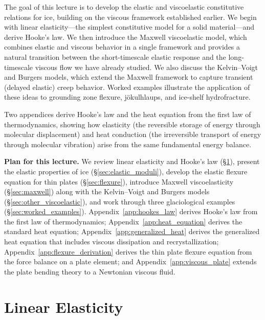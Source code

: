 \documentclass[11pt]{article}
\begin{document}
\medskip
\noindent The goal of this lecture is to develop the elastic and viscoelastic constitutive relations for ice, building on the viscous framework established earlier.  We begin with linear elasticity---the simplest constitutive model for a solid material---and derive Hooke's law.  We then introduce the Maxwell viscoelastic model, which combines elastic and viscous behavior in a single framework and provides a natural transition between the short-timescale elastic response and the long-timescale viscous flow we have already studied.  We also discuss the Kelvin--Voigt and Burgers models, which extend the Maxwell framework to capture transient (delayed elastic) creep behavior.  Worked examples illustrate the application of these ideas to grounding zone flexure, j\"{o}kulhlaups, and ice-shelf hydrofracture.

\medskip
\noindent Two appendices derive Hooke's law and the heat equation from the first law of thermodynamics, showing how elasticity (the reversible storage of energy through molecular displacement) and heat conduction (the irreversible transport of energy through molecular vibration) arise from the same fundamental energy balance.

\medskip
\noindent\textbf{Plan for this lecture.}  We review linear elasticity and Hooke's law (\S\ref{sec:elasticity}), present the elastic properties of ice (\S\ref{sec:elastic_moduli}), develop the elastic flexure equation for thin plates (\S\ref{sec:flexure}), introduce Maxwell viscoelasticity (\S\ref{sec:maxwell}) along with the Kelvin--Voigt and Burgers models (\S\ref{sec:other_viscoelastic}), and work through three glaciological examples (\S\ref{sec:worked_examples}).  Appendix~\ref{app:hookes_law} derives Hooke's law from the first law of thermodynamics; Appendix~\ref{app:heat_equation} derives the standard heat equation; Appendix~\ref{app:generalized_heat} derives the generalized heat equation that includes viscous dissipation and recrystallization; Appendix~\ref{app:flexure_derivation} derives the thin plate flexure equation from the force balance on a plate element; and Appendix~\ref{app:viscous_plate} extends the plate bending theory to a Newtonian viscous fluid.

\section{Linear Elasticity}
\label{sec:elasticity}
\end{document}
